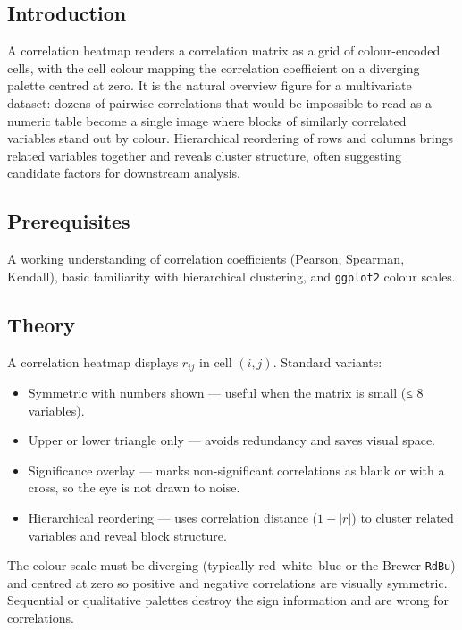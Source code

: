 \documentclass[
]{article}
\author{}
\date{\vspace{-2.5em}}
\providecommand{\tightlist}{%
  \setlength{\itemsep}{0pt}\setlength{\parskip}{0pt}}
\begin{document}
\subsection{Introduction}\label{introduction}

A correlation heatmap renders a correlation matrix as a grid of
colour-encoded cells, with the cell colour mapping the correlation
coefficient on a diverging palette centred at zero. It is the natural
overview figure for a multivariate dataset: dozens of pairwise
correlations that would be impossible to read as a numeric table become
a single image where blocks of similarly correlated variables stand out
by colour. Hierarchical reordering of rows and columns brings related
variables together and reveals cluster structure, often suggesting
candidate factors for downstream analysis.

\subsection{Prerequisites}\label{prerequisites}

A working understanding of correlation coefficients (Pearson, Spearman,
Kendall), basic familiarity with hierarchical clustering, and
\texttt{ggplot2} colour scales.

\subsection{Theory}\label{theory}

A correlation heatmap displays \(r_{ij}\) in cell \((i, j)\). Standard
variants:

\begin{itemize}
\tightlist
\item
  Symmetric with numbers shown --- useful when the matrix is small (≤ 8
  variables).
\item
  Upper or lower triangle only --- avoids redundancy and saves visual
  space.
\item
  Significance overlay --- marks non-significant correlations as blank
  or with a cross, so the eye is not drawn to noise.
\item
  Hierarchical reordering --- uses correlation distance (\(1 - |r|\)) to
  cluster related variables and reveal block structure.
\end{itemize}

The colour scale must be diverging (typically red--white--blue or the
Brewer \texttt{RdBu}) and centred at zero so positive and negative
correlations are visually symmetric. Sequential or qualitative palettes
destroy the sign information and are wrong for correlations.
\end{document}
